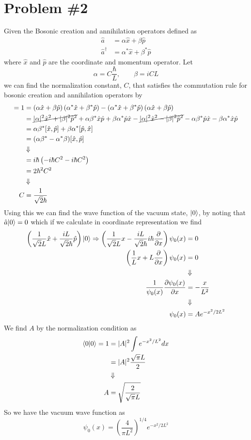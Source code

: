 \documentclass[11pt]{article}
\numberwithin{equation}{section}
\begin{document}
\section{Problem \#2}
Given the Bosonic creation and annihilation operators defined as
\begin{align*}
\hat{a} &= \alpha\hat{x} + \beta\hat{p}\\
\hat{a}^{\dagger} &= \alpha^*\hat{x} + \beta^*\hat{p}
\end{align*}
where $\hat{x}$ and $\hat{p}$ are the coordinate and momentum operator. Let 
$$\alpha=C\frac{\hbar}{L},\qquad\beta=iCL$$
we can find the normalization constant, $C$, that satisfies the commutation rule for bosonic
creation and annihilation operators by
\begin{align*}
[\hat{a},\hat{a}^{\dagger}] = 1 &= \left(\alpha\hat{x} + \beta\hat{p}\right)\left(\alpha^*\hat{x} + \beta^*\hat{p}\right) - \left( \alpha^*\hat{x} + \beta^*\hat{p}\right)\left(\alpha\hat{x} + \beta\hat{p}\right)\\
&= \cancel{|\alpha|^2\hat{x}^2 + |\beta|^2\hat{p}^2} + \alpha\beta^*\hat{x}\hat{p} + \beta\alpha^*\hat{p}\hat{x}
- \cancel{|\alpha|^2\hat{x}^2 - |\beta|^2\hat{p}^2} - \alpha\beta^*\hat{p}\hat{x} - \beta\alpha^*\hat{x}\hat{p}\\
&= \alpha\beta^*[\hat{x},\hat{p}] + \beta\alpha^*[\hat{p},\hat{x}]\\
&= (\alpha\beta^*-\alpha^*\beta)[\hat{x},\hat{p}]\\
&\Downarrow\\
&= i\hbar\left(-i\hbar{C^2}-i\hbar{C^2}\right)\\
&= 2\hbar^2{C^2}\\
&\Downarrow\\
C &= \frac{1}{\sqrt{2}\hbar}
\end{align*}
Using this we can find the wave function of the vacuum state, $|{0}\rangle$, by noting that 
$\hat{a}|{0}\rangle = 0$ which if we calculate in coordinate representation we find
\begin{align*}
\left(\frac{1}{\sqrt{2}L}\hat{x} + \frac{iL}{\sqrt{2}\hbar}\hat{p}\right)|{0}\rangle \Rightarrow \left(\frac{1}{\sqrt{2}L}x - \frac{iL}{\sqrt{2}\hbar}i\hbar\frac{\partial{}}{\partial{x}}\right)\psi_0(x) &= 0\\
\left(\frac{1}{L}x + L\frac{\partial{}}{\partial{x}}\right)\psi_0(x) &= 0\\
&\Downarrow\\
\frac{1}{\psi_0(x)}\frac{\partial{\psi_0(x)}}{\partial{x}} &= - \frac{x}{L^2}\\
&\Downarrow\\
\psi_{0}(x) &= Ae^{-x^2/2L^2}
\end{align*}
We find $A$ by the normalization condition as
\begin{align*}
\langle{0}|{0}\rangle = 1 &= |A|^2\int e^{-x^2/L^2}dx\\
&= |A|^2 \frac{\sqrt{\pi}L}{2}\\
&\Downarrow\\
A &= \sqrt{\frac{2}{\sqrt{\pi}L}}
\end{align*}
So we have the vacuum wave function as
$$\psi_{0}(x) = \left(\frac{4}{\pi L^2}\right)^{1/4}e^{-x^2/2L^2}$$
\end{document}
